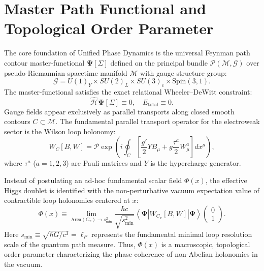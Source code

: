 \documentclass[11pt,a4paper]{article}
\begin{document}
\section{Master Path Functional and Topological Order Parameter}
The core foundation of Unified Phase Dynamics is the universal Feynman path contour master-functional $\mathbf{\Psi}[\Sigma]$ defined on the principal bundle $\mathcal{P}(\mathcal{M}, \mathcal{G})$ over pseudo-Riemannian spacetime manifold $\mathcal{M}$ with gauge structure group:
\begin{equation}
\mathcal{G} = U(1)_Y \times SU(2)_L \times SU(3)_c \times \text{Spin}(3,1).
\label{eq:gauge_group}
\end{equation}
The master-functional satisfies the exact relational Wheeler--DeWitt constraint:
\begin{equation}
\hat{\mathcal{H}} \mathbf{\Psi}[\Sigma] \equiv 0, \quad E_{\mathrm{total}} \equiv 0.
\label{eq:WDW}
\end{equation}
Gauge fields appear exclusively as parallel transports along closed smooth contours $C \subset \mathcal{M}$. The fundamental parallel transport operator for the electroweak sector is the Wilson loop holonomy:
\begin{equation}
W_{C}[B, W] = \mathcal{P} \exp \left( i \oint_C \left[ \frac{g'}{2} Y B_\mu + g \frac{\tau^a}{2} W_\mu^a \right] dx^\mu \right),
\label{eq:holonomy}
\end{equation}
where $\tau^a$ ($a=1,2,3$) are Pauli matrices and $Y$ is the hypercharge generator. 

Instead of postulating an ad-hoc fundamental scalar field $\Phi(x)$, the effective Higgs doublet is identified with the non-perturbative vacuum expectation value of contractible loop holonomies centered at $x$:
\begin{equation}
\Phi(x) \equiv \lim_{\mathrm{Area}(C_x) \to s_{\mathrm{min}}^2} \frac{\hbar c}{\sqrt{s_{\mathrm{min}}^2}} \left\langle \mathbf{\Psi} \left| W_{C_x}[B, W] \right| \mathbf{\Psi} \right\rangle \begin{pmatrix} 0 \\ 1 \end{pmatrix}.
\label{eq:Higgs_definition}
\end{equation}
Here $s_{\mathrm{min}} \equiv \sqrt{\hbar G / c^3} = \ell_P$ represents the fundamental minimal loop resolution scale of the quantum path measure. Thus, $\Phi(x)$ is a macroscopic, topological order parameter characterizing the phase coherence of non-Abelian holonomies in the vacuum.
\end{document}
